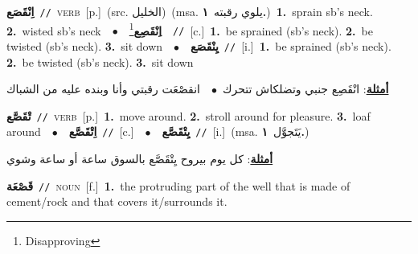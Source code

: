 \documentclass[10pt,a4paper,twoside]{article} %
\begin{document}
\begin{multicols}{2}
{\setlength\topsep{0pt}\textbf{\foreignlanguage{arabic}{اِنْقَصَع}}\ {\color{gray}\texttt{//}\color{black}}\ \textsc{verb}\ [p.]\ (src. \color{gray}\foreignlanguage{arabic}{الخليل}\color{black})\ \color{gray}(msa. \foreignlanguage{arabic}{يلوي رقبته}~\foreignlanguage{arabic}{\textbf{١.}})\color{black}\ \textbf{1.}~sprain sb's neck.  \textbf{2.}~wisted sb's neck\ \ $\bullet$\ \ \setlength\topsep{0pt}\textbf{\foreignlanguage{arabic}{اِنْقَصِع}}\footnote{Disapproving}\ \ {\color{gray}\texttt{//}\color{black}}\ [c.]\ \textbf{1.}~be sprained (sb's neck).  \textbf{2.}~be twisted (sb's neck).  \textbf{3.}~sit down\ \ $\bullet$\ \ \setlength\topsep{0pt}\textbf{\foreignlanguage{arabic}{يِنْقَصَع}}\ {\color{gray}\texttt{//}\color{black}}\ [i.]\ \textbf{1.}~be sprained (sb's neck).  \textbf{2.}~be twisted (sb's neck).  \textbf{3.}~sit down\  \begin{flushright}\color{gray}\foreignlanguage{arabic}{\textbf{\underline{\foreignlanguage{arabic}{أمثلة}}}: انْقَصِع جنبي وتضلكاش تتحرك\ $\bullet$\ \  انقصْعَت رقبتي وأنا وبنده عليه من الشباك}\end{flushright}\color{black}} \vspace{2mm}

{\setlength\topsep{0pt}\textbf{\foreignlanguage{arabic}{تْقَصَّع}}\ {\color{gray}\texttt{//}\color{black}}\ \textsc{verb}\ [p.]\ \textbf{1.}~move around.  \textbf{2.}~stroll around for pleasure.  \textbf{3.}~loaf around\ \ $\bullet$\ \ \setlength\topsep{0pt}\textbf{\foreignlanguage{arabic}{اِتْقَصَّع}}\ {\color{gray}\texttt{//}\color{black}}\ [c.]\ \ $\bullet$\ \ \setlength\topsep{0pt}\textbf{\foreignlanguage{arabic}{يِتْقَصَّع}}\ {\color{gray}\texttt{//}\color{black}}\ [i.]\ \color{gray}(msa. \foreignlanguage{arabic}{يَتَجوَّل}~\foreignlanguage{arabic}{\textbf{١.}})\color{black}\  \begin{flushright}\color{gray}\foreignlanguage{arabic}{\textbf{\underline{\foreignlanguage{arabic}{أمثلة}}}: كل يوم بيروح يِتْقَصَّع بالسوق ساعة أو ساعة وشوي}\end{flushright}\color{black}} \vspace{2mm}

{\setlength\topsep{0pt}\textbf{\foreignlanguage{arabic}{قَصْعَة}}\ {\color{gray}\texttt{//}\color{black}}\ \textsc{noun}\ [f.]\ \textbf{1.}~the protruding part of the well that is made of cement/rock and that covers it/surrounds it.\ } \vspace{2mm}


\end{multicols}
\end{document}
